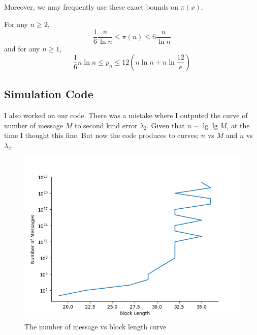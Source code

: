 \documentclass{article}
\begin{document}
Moreover, we may frequently use these exact bounds on \(\pi(x)\).
\begin{lemma}\label{lmm:ineqpnt}
	For any \(n \geq 2\), 
	\begin{equation*}
		\dfrac{1}{6} \dfrac{n}{\ln n} \leq \pi(n) \leq 6 \dfrac{n}{\ln n}
	\end{equation*}
	and for any \(n \geq 1\),
	\begin{equation*}
		\dfrac{1}{6} n \ln n \leq p_n \leq 12 (n \ln n + n \ln \frac{12}{e})
	\end{equation*}
\end{lemma}
\subsection{Simulation Code}
I also worked on our code. There was a mistake where I outputed the curve of number of message \(M\)  to second kind error  \(\lambda_2\). Given that \(n \sim \lg \lg M\), at the time I thought this fine. But now the code produces to curves; \(n\) vs \(M\) and \(n\) vs \(\lambda_2\). 
\begin{figure}
	\includegraphics*[height = 0.4 \textheight]{MessageVsBlocklength.png}
	\caption{The number of message vs block length curve}
\end{figure}
\end{document}
